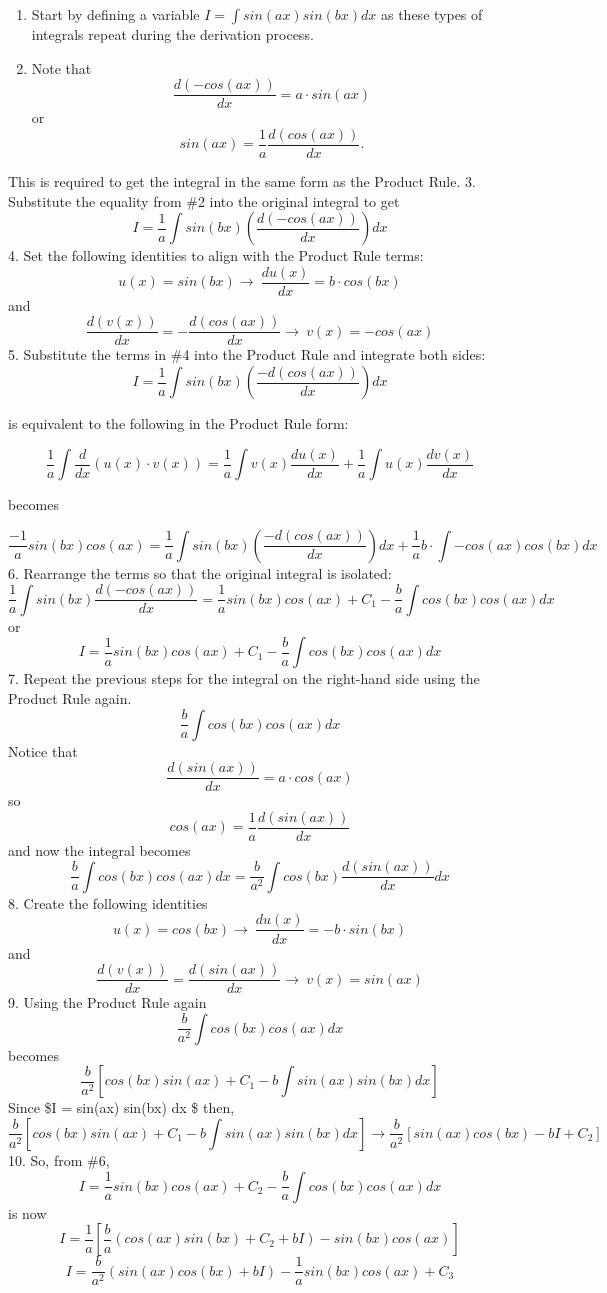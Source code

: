 \documentclass[11pt]{article}
\providecommand{\tightlist}{%
      \setlength{\itemsep}{0pt}\setlength{\parskip}{0pt}}
\begin{document}
\begin{enumerate}
\def\labelenumi{\arabic{enumi}.}
\tightlist
\item
  Start by defining a variable \(I = \int sin(ax)sin(bx) dx\) as these
  types of integrals repeat during the derivation process.
\item
  Note that \[\frac {d (-cos(ax))}{dx} = a \cdot sin(ax)\] or
  \[sin(ax) = \frac {1}{a} \frac {d(cos(ax))}{dx} .\]
\end{enumerate}

This is required to get the integral in the same form as the Product
Rule. 3. Substitute the equality from \#2 into the original integral to
get \[I = \frac{1}{a}\int sin(bx) (\frac {d(-cos(ax))}{dx}){dx}\] 4. Set
the following identities to align with the Product Rule terms:
\[u(x) = sin(bx) \to\ \frac{d u(x)}{dx} = b \cdot cos(bx)\] and
\[\frac {d (v(x))}{dx} = -\frac {d (cos(ax))}{dx} \to\ v(x) = -cos(ax)\]
5. Substitute the terms in \#4 into the Product Rule and integrate both
sides: \[I = \frac{1}{a}\int sin(bx) (\frac {-d(cos(ax))}{dx}){dx}\]

is equivalent to the following in the Product Rule form:

\[\frac {1}{a} \int \frac {d}{dx} (u(x) \cdot v(x)) = \frac {1}{a} \int v(x) \frac {du(x)}{dx} + \frac {1}{a} \int u(x) \frac {dv(x)}{dx}\]

becomes

\[\frac {-1}{a} sin(bx) cos(ax) = \frac {1}{a} \int sin(bx) \left(\frac {-d(cos(ax))}{dx} \right) dx + \frac {1}{a} b \cdot \int -cos(ax) cos(bx){dx}\]
6. Rearrange the terms so that the original integral is isolated:
\[\frac {1}{a} \int sin(bx) \frac {d(-cos(ax))}{dx} = \frac {1}{a} sin(bx) cos(ax) + C_1 - \frac {b}{a} \int cos(bx) cos(ax) dx \]
or
\[I = \frac {1}{a} sin(bx) cos(ax) + C_1 - \frac {b}{a} \int cos(bx) cos(ax) dx \]
7. Repeat the previous steps for the integral on the right-hand side
using the Product Rule again.\\
\[\frac {b}{a} \int cos(bx) cos(ax) dx \] Notice that
\[\frac {d (sin(ax))}{dx} = a \cdot cos(ax)\] so
\[cos(ax) = \frac {1}{a} \frac {d(sin(ax))}{dx}\] and now the integral
becomes
\[\frac {b}{a} \int cos(bx) cos(ax) dx = \frac {b}{a^2}\int  cos(bx) \frac {d(sin(ax))}{dx} dx \]
8. Create the following identities
\[u(x) = cos(bx) \to\ \frac{d u(x)}{dx} = -b \cdot sin(bx)\] and
\[\frac {d (v(x))}{dx} = \frac {d (sin(ax))}{dx} \to\ v(x) = sin(ax)\]
9. Using the Product Rule again
\[\frac {b}{a^2} \int cos(bx) cos(ax) dx \] becomes
\[\frac{b}{a^2} [ cos(bx) sin(ax) + C_1  - b \int sin(ax) sin(bx) dx] \]
Since \$I = \int sin(ax) sin(bx) dx \$ then,
\[\frac{b}{a^2} [ cos(bx) sin(ax) + C_1  - b \int sin(ax) sin(bx) dx] \rightarrow \frac{b}{a^2} [ sin(ax) cos(bx) - b I  + C_2]\]
10. So, from \#6,
\[I = \frac {1}{a} sin(bx) cos(ax) + C_2 - \frac {b}{a} \int cos(bx) cos(ax) dx \]
is now
\[I = \frac {1}{a} \left [\frac {b}{a} \left(cos(ax) sin(bx) + C_2  + b I \right) - sin(bx)cos(ax)\right]\]
\[I = \frac {b}{a^2} \left( sin(ax) cos(bx) + b I \right) - \frac {1}{a}sin(bx)cos(ax) + C_3\]
\end{document}
